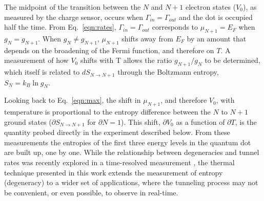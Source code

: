 \documentclass[twocolumn,showpacs,preprintnumbers,amsmath,amssymb,pra,aps,superscriptaddress]{revtex4-1}
\begin{document}
The midpoint of the transition between the $N$ and $N+1$ electron states ($V_0$), as measured by the charge sensor, occurs when $\Gamma_{in} = \Gamma_{out}$ and the dot is occupied half the time. From Eq.~\ref{eqn:rates}, $\Gamma_{in} = \Gamma_{out}$ corresponds to $\mu_{N+1} = E_F$ when $g_{N}=g_{N+1}$. When $g_{N}\neq g_{N+1}$, $\mu_{N+1}$ shifts away from $E_F$ by an amount that depends on the broadening of the Fermi function, and therefore on $T$.   A measurement of how $V_0$ shifts with T allows the ratio $g_{N+1}/g_{N}$ to be determined, which itself is related to $dS_{N\rightarrow N+1}$ through the Boltzmann entropy, $S_{N}=k_{B} \ln{g_N}$.  

Looking back to Eq.~\ref{eqn:max}, the shift in $\mu_{N+1}$, and therefore $V_0$, with temperature is proportional to the entropy difference between the $N$ to $N+1$ ground states ($\partial S_{N\rightarrow N+1}$ for $\partial N=1$).  This shift, $\partial V_0$ as a function of $\partial T$, is the quantity probed directly in the experiment described below. From these measurements the entropies of the first three energy levels in the quantum dot are built up, one by one. While the relationship between degeneracies and tunnel rates was recently explored in a time-resolved measurement \cite{Hofmann2016}, the thermal technique presented in this work extends the measurement of entropy (degeneracy) to a wider set of applications, where the tunneling process may not be convenient, or even possible, to observe in real-time.

\end{document}
